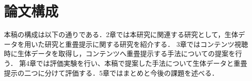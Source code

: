





\section{論文構成}
本稿の構成は以下の通りである．2章では本研究に関連する研究として，生体データを用いた研究と重畳提示に関する研究を紹介する．
3章ではコンテンツ視聴時に生体データを取得し，コンテンツへ重畳提示する手法についての提案を行う．
第4章では評価実験を行い、本稿で提案した手法について生体データと重畳提示の二つに分けて評価する．5章ではまとめと今後の課題を述べる．

